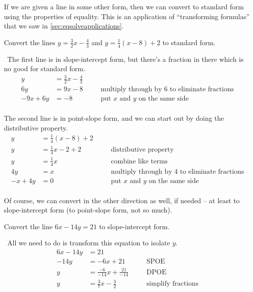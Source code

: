 If we are given a line in some other form, then we can convert to standard form using the properties of equality. This is an application of ``transforming formulas'' that we saw in \cref{sec:eqsolveapplications}.

\begin{boxedex}
Convert the lines $y=\frac{3}{2}x-\frac{4}{3}$ and $y=\frac{1}{4}(x-8)+2$ to standard form.

\exsoln\ The first line is in slope-intercept form, but there's a fraction in there which is no good for standard form.
\[\begin{aligned}
y &= \frac{3}{2}x-\frac{4}{3}\\
6y &= 9x-8
&& \quad\text{multiply through by 6 to eliminate fractions}\\
-9x + 6y &= -8
&& \quad\text{put $x$ and $y$ on the same side}\\
\end{aligned}\]

The second line is in point-slope form, and we can start out by doing the distributive property.
\[\begin{aligned}
y &= \frac{1}{4}(x-8)+2\\[1ex]
y &= \frac{1}{4}x-2+2
&& \quad\text{distributive property}\\[1ex]
y &= \frac{1}{4}x
&& \quad\text{combine like terms}\\[1ex]
4y &= x
&& \quad\text{multiply through by 4 to eliminate fractions}\\
-x + 4y &= 0
&& \quad\text{put $x$ and $y$ on the same side}\\
\end{aligned}\]
\end{boxedex}

Of course, we can convert in the other direction as well, if needed -- at least to slope-intercept form (to point-slope form, not so much).

\begin{boxedex}
Convert the line $6x - 14y = 21$ to slope-intercept form.

\exsoln\ All we need to do is transform this equation to isolate $y$.
\[\begin{aligned}
6x - 14y &= 21\\
-14y &= -6x + 21
&& \quad\text{SPOE}\\
y &= \frac{-6}{-14}x + \frac{21}{-14}
&& \quad\text{DPOE}\\
y &= \frac{3}{7}x - \frac{3}{2}
&& \quad\text{simplify fractions}\\
\end{aligned}\]
\end{boxedex}

